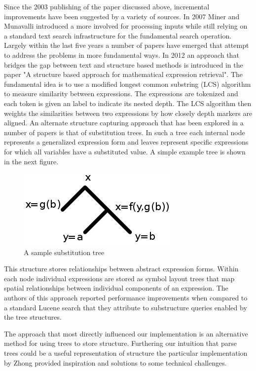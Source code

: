 \documentclass{sig-alternate}
\begin{document}
Since the 2003 publishing of the paper discussed above, incremental
improvements have been suggested by a variety of sources. In 2007 Miner
and Munavalli introduced a more involved for processing inputs while
still relying on a standard text search infrastructure for the 
fundamental search operation.\cite{miner:approach} Largely within the last five years a number of 
papers have emerged that attempt to address the problems in more
fundamental ways.
In 2012 an approach that bridges the gap between text and structure based
methods is introduced in the paper "A structure based
approach for mathematical expression retrieval".\cite{kumar:structure} The fundamental
idea is to use a modified longest common substring (LCS) algorithm to 
measure similarity between expressions. The expressions are tokenized
and each token is given an label to indicate its nested depth. The LCS
algorithm then weights the similarities between two expressions by how
closely depth markers are aligned. 
An alternate structure capturing approach that has been explored in
a number of papers is that of substitution trees.\cite{kolhase:mathwebsearch}\cite{yuan:layout} In such a tree each
internal node represents a generalized expression form and leaves
represent specific expressions for which all variables have a 
substituted value. A simple example tree is shown in the next figure.
\begin{figure}
	\centering
    \includegraphics[scale=0.75]{subtree}
	\caption{A sample substitution tree}
\end{figure}
This structure stores relationships between abstract expression forms.
Within each node individual expressions are stored as symbol layout trees
that map spatial relationships between individual components of an expression.
The authors of this approach reported performance improvements when compared
to a standard Lucene search that they attribute to substructure queries 
enabled by the tree structures. 

The approach that most directly influenced our implementation is an
alternative method for using trees to store structure. Furthering our
intuition that parse trees could be a useful representation of structure
the particular implementation by Zhong provided inspiration and 
solutions to some technical challenges.\cite{zhong:cowpie}
\end{document}
